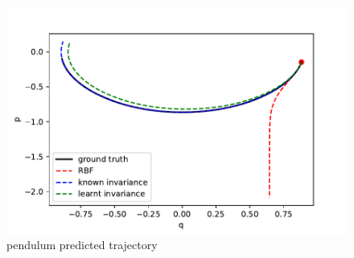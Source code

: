 \documentclass{statsmsc}
\begin{document}
\begin{figure}[H]
        \centering
        \includegraphics[width=\linewidth]{../codes/figures/pendulum_predicted.pdf}
        \caption{pendulum predicted trajectory}
        \label{fig:pendulum_prediction}
\end{figure}
\end{document}
